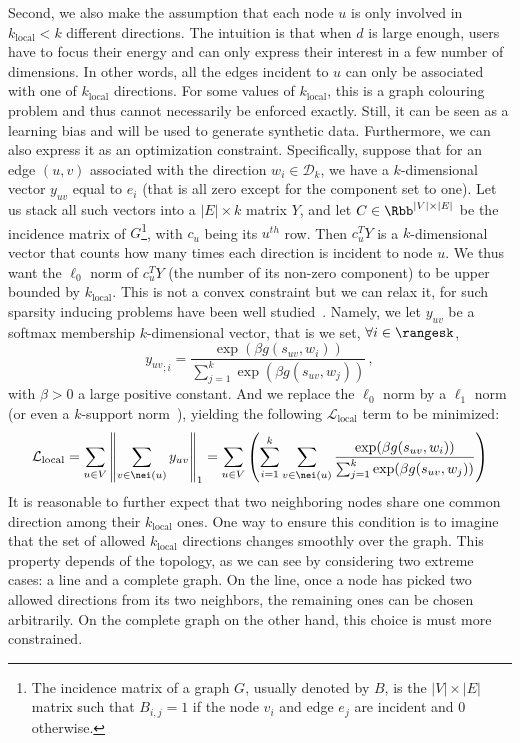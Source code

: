 Second, we also make the assumption that each node $u$ is only involved in $k_\mathrm{local} < k$
different directions. The intuition is that when $d$ is large enough, users have to focus their
energy and can only express their interest in a few number of dimensions. In other words, all the
edges incident to $u$ can only be associated with one of $k_\mathrm{local}$ directions. For
some values of
$k_\mathrm{local}$, this is a \NPc{} graph colouring problem and thus cannot necessarily be enforced
exactly. Still, it can be seen as a learning bias and will be used to generate synthetic data.
Furthermore, we can also express it as an optimization constraint. Specifically, suppose that for
an edge $(u,v)$ associated with the direction $w_i \in \mathcal{D}_k$, we have a $k$-dimensional
vector $y_{uv}$ equal to $e_i$ (that is all zero except for the \ith{} component set to one). Let
us stack all such vectors into a $|E| \times k$ matrix $Y$, and let $C \in \Rbb^{|V| \times |E|}$ be
the incidence matrix of $G$\footnote{The incidence matrix of a graph $G$, usually denoted by $B$, is
the $|V| \times |E|$ matrix such that $B_{i,j} = 1$ if the node $v_i$ and edge $e_j$ are incident
and 0 otherwise.}, with $c_u$ being its $u^{th}$ row. Then $c_u^TY$ is a $k$-dimensional vector that counts
how many times each direction is incident to node $u$. We thus want the $\ell_0$ norm of $c_u^TY$
(\ie the number of its non-zero component) to be upper bounded by $k_\mathrm{local}$.
This is not a convex constraint but we can relax it, for such sparsity inducing problems have been
well studied~\autocite{sparseOptim12}. Namely, we let $y_{uv}$ be a softmax membership
$k$-dimensional vector, that is we set, $\forall i \in \rangesk$,
\begin{equation*}
  {y_{uv}}_{;i} = \frac{\exp(\beta g(s_{uv}, w_i))}{\sum_{j=1}^k \exp(\beta g(s_{uv}, w_j))}\,,
\end{equation*}
with $\beta>0$ a large
positive constant.  And we replace the $\ell_0$ norm by a $\ell_1$ norm (or even a $k$-support
norm~\autocite{KsupportNorm12}), yielding the following $\mathcal{L}_{\mathrm{local}}$ term to be
minimized:
\begin{equation}
  \label{eq:edge_local_loss}
  \mathcal{L}_{\mathrm{local}} =
  \sum_{u \in V} \left\| \sum_{v \in \nei(u)} y_{uv} \right\|_1 =
  \sum_{u \in V} \left( \sum_{i = 1}^k \sum_{v \in \nei(u)}
  \frac{\exp(\beta g(s_{uv}, w_i))}{\sum_{j=1}^k \exp(\beta g(s_{uv}, w_j))} \right)
\end{equation}
It is reasonable to further expect that two neighboring nodes share one common direction among their
$k_\mathrm{local}$ ones. One way to ensure this condition is to imagine that the set of allowed
$k_\mathrm{local}$ directions changes smoothly over the graph. This property depends of the
topology, as we can see by considering two extreme cases: a line and a complete graph. On the line,
once a node has picked two allowed directions from its two neighbors, the remaining ones can be
chosen arbitrarily. On the complete graph on the other hand, this choice is must more constrained.

